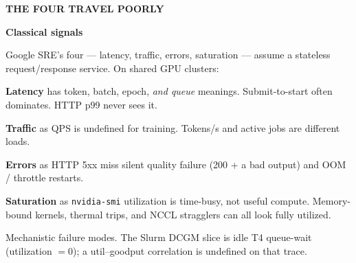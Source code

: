 \documentclass[12pt]{article}
\newlength{\colw}
\newcommand{\gutterh}{\hspace{0.023\textwidth}}
\newcommand{\kicker}[1]{%
  {\fontsize{18}{22}\selectfont\bfseries\color{pytorch}\MakeUppercase{#1}\par}\vspace{0.08in}}
\newcommand{\sectionhead}[1]{%
  {\fontsize{36}{42}\selectfont\bfseries\color{navy}#1\par}\vspace{0.16in}}
\newcommand{\body}{\fontsize{26}{33}\selectfont\color{ink}}
\newcommand{\captiontext}{\fontsize{20}{26}\selectfont\color{muted}}
\begin{document}
\vspace{0.36in}

\begin{minipage}[t]{\colw}
\kicker{The four travel poorly}
\sectionhead{Classical signals}

{\body
Google SRE's four --- latency, traffic, errors, saturation --- assume a
stateless request/response service. On shared GPU clusters:
}

\vspace{0.20in}
{\body
{\bfseries\color{navy}Latency} has token, batch, epoch, \emph{and queue}
meanings. Submit-to-start often dominates. HTTP p99 never sees it.

\vspace{0.16in}
{\bfseries\color{navy}Traffic} as QPS is undefined for training.
Tokens/s and active jobs are different loads.

\vspace{0.16in}
{\bfseries\color{navy}Errors} as HTTP 5xx miss silent quality failure
(200 + a bad output) and OOM / throttle restarts.

\vspace{0.16in}
{\bfseries\color{navy}Saturation} as \texttt{nvidia-smi} utilization is
time-busy, not useful compute. Memory-bound kernels, thermal trips, and
NCCL stragglers can all look fully utilized.
}

\vspace{0.20in}
{\captiontext
Mechanistic failure modes. The Slurm DCGM slice is idle T4 queue-wait
(utilization $=0$); a util--goodput correlation is undefined on that trace.}
\end{minipage}%
\gutterh
\end{document}
